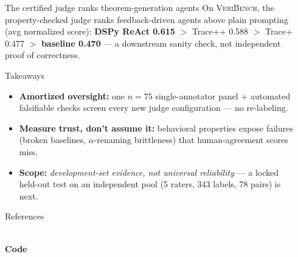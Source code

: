 \documentclass[final]{beamer}
\newlength{\sepwidth}
\newlength{\colwidth}
\newcommand{\separatorcolumn}{\begin{column}{\sepwidth}\end{column}}
\begin{document}
\begin{frame}[t]
\begin{columns}[t]
\begin{column}{\colwidth}
\begin{block}{The certified judge ranks theorem-generation agents}
    On \textsc{VeriBench}, the property-checked judge ranks feedback-driven agents above plain prompting (avg normalized score): \textbf{DSPy ReAct 0.615} $>$ Trace++ 0.588 $>$ Trace+ 0.477 $>$ \textbf{baseline 0.470} --- a downstream sanity check, not independent proof of correctness.

  \end{block}

  \begin{alertblock}{Takeaways}

    \begin{itemize}
      \item \textbf{Amortized oversight:} one $n{=}75$ single-annotator panel + automated falsifiable checks screen every new judge configuration --- no re-labeling.
      \item \textbf{Measure trust, don't assume it:} behavioral properties expose failures (broken baselines, $\alpha$-renaming brittleness) that human-agreement scores miss.
      \item \textbf{Scope:} \emph{development-set evidence, not universal reliability} --- a locked held-out test on an independent pool (5 raters, 343 labels, 78 pairs) is next.
    \end{itemize}

  \end{alertblock}

  \begin{block}{References}

    \nocite{*}
    \begin{minipage}[c]{0.74\linewidth}
      \footnotesize{}
    \end{minipage}\hfill
    \begin{minipage}[c]{0.22\linewidth}
      \centering
      \\[0.8ex]
      {\small \textbf{Code}}
    \end{minipage}

  \end{block}

\end{column}

\separatorcolumn
\end{columns}
\end{frame}
\end{document}
